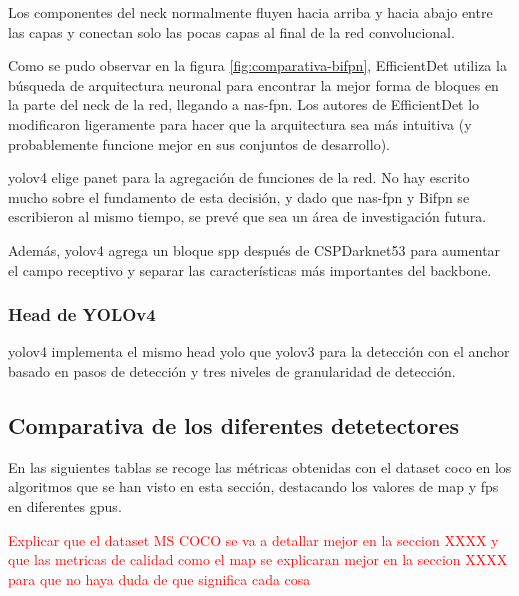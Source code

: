 Los componentes del neck normalmente fluyen hacia arriba y hacia abajo entre las capas y conectan solo las pocas capas al final de la red convolucional.

Como se pudo observar en la figura \ref{fig:comparativa-bifpn}, EfficientDet utiliza la búsqueda de arquitectura neuronal para encontrar la mejor forma de bloques en la parte del neck de la red, llegando a \gls{nas}-\gls{fpn}. Los autores de EfficientDet lo modificaron ligeramente para hacer que la arquitectura sea más intuitiva (y probablemente funcione mejor en sus conjuntos de desarrollo).

\gls{yolov4} elige \gls{pan}et para la agregación de funciones de la red. No hay escrito mucho sobre el fundamento de esta decisión, y dado que \gls{nas}-\gls{fpn} y Bi\gls{fpn} se escribieron al mismo tiempo, se prevé que sea un área de investigación futura.

Además, \gls{yolov4} agrega un bloque \gls{spp} después de CSPDarknet53 para aumentar el campo receptivo y separar las características más importantes del backbone.

\subsubsection*{Head de YOLOv4}
\label{subsubsec:yolov4-head}

\gls{yolov4} implementa el mismo head \gls{yolo} que \gls{yolo}v3 \cite{redmon2018yolov3} para la detección con el anchor basado en pasos de detección y tres niveles de granularidad de detección.

\subsection{Comparativa de los diferentes detetectores}
\label{subsec:comparativa-detectores}

En las siguientes tablas se recoge las métricas obtenidas con el dataset \gls{coco} en los algoritmos que se han visto en esta sección, destacando los valores de \gls{map} y \gls{fps} en diferentes \gls{gpu}s.

\textcolor{red}{Explicar que el dataset MS COCO se va a detallar mejor en la seccion XXXX y que las metricas de calidad como el map se explicaran mejor en la seccion XXXX para que no haya duda de que significa cada cosa}

